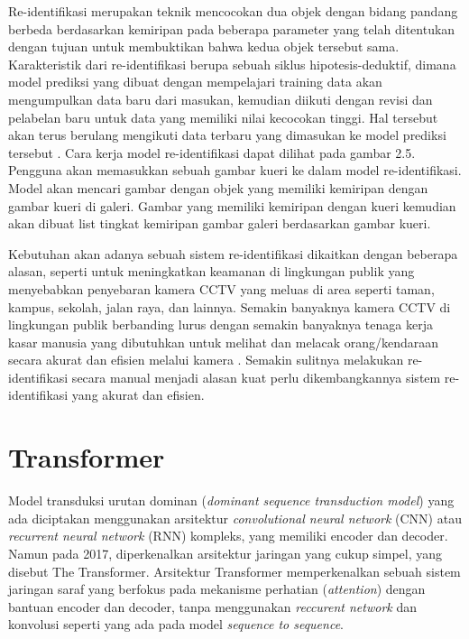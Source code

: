 Re-identifikasi merupakan teknik mencocokan dua objek dengan bidang pandang berbeda berdasarkan kemiripan pada beberapa parameter yang telah 
ditentukan dengan tujuan untuk membuktikan bahwa kedua objek tersebut sama. Karakteristik dari re-identifikasi berupa sebuah siklus hipotesis-deduktif, 
dimana model prediksi yang dibuat dengan mempelajari training data akan mengumpulkan data baru dari masukan, kemudian diikuti dengan revisi dan 
pelabelan baru untuk data yang memiliki nilai kecocokan tinggi. Hal tersebut akan terus berulang mengikuti data terbaru yang dimasukan ke model 
prediksi tersebut \parencite{Wechsler2014}. Cara kerja model re-identifikasi dapat dilihat pada gambar 2.5. Pengguna akan memasukkan sebuah gambar 
kueri ke dalam model re-identifikasi. Model akan mencari gambar dengan objek yang memiliki kemiripan dengan gambar kueri di galeri. Gambar yang memiliki 
kemiripan dengan kueri kemudian akan dibuat list tingkat kemiripan gambar galeri berdasarkan gambar kueri.

Kebutuhan akan adanya sebuah sistem re-identifikasi dikaitkan dengan beberapa alasan, seperti untuk meningkatkan keamanan di lingkungan publik 
yang menyebabkan penyebaran kamera CCTV yang meluas di area seperti taman, kampus, sekolah, jalan raya, dan lainnya. Semakin banyaknya kamera CCTV 
di lingkungan publik berbanding lurus dengan semakin banyaknya tenaga kerja kasar manusia yang dibutuhkan untuk melihat dan melacak orang/kendaraan 
secara akurat dan efisien melalui kamera \parencite{Zheng2016}. Semakin sulitnya melakukan re-identifikasi secara manual menjadi alasan kuat perlu dikembangkannya 
sistem re-identifikasi yang akurat dan efisien.

\section{Transformer}
\label{sec:transformer}

Model transduksi urutan dominan (\emph{dominant sequence transduction model}) yang ada diciptakan menggunakan arsitektur \emph{convolutional neural network} 
(CNN) atau \emph{recurrent neural network} (RNN) kompleks, yang memiliki encoder dan decoder. Namun pada 2017, diperkenalkan arsitektur jaringan yang cukup 
simpel, yang disebut The Transformer. Arsitektur Transformer memperkenalkan sebuah sistem jaringan saraf yang berfokus pada mekanisme perhatian (\emph{attention}) 
dengan bantuan encoder dan decoder, tanpa menggunakan \emph{reccurent network} dan konvolusi seperti yang ada pada model \emph{sequence to sequence}. \parencite{Vaswani2017}

